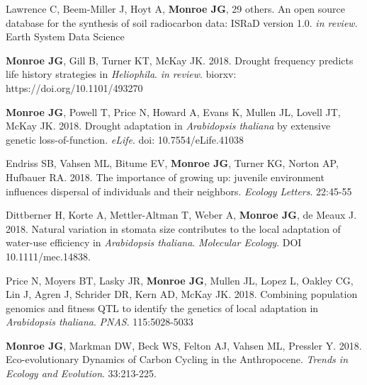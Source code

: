 \documentclass[12pt,english]{article}
\begin{document}
\begin{hangparas}{.5in}{1}
\hspace{1em} Lawrence C, Beem-Miller J, Hoyt A, \textbf{Monroe JG},  29 others. An open source database for the synthesis of soil radiocarbon data: ISRaD version 1.0. \textit{in review}. Earth System Data Science
\vspace{1ex}\par
\hspace{1em} \textbf{Monroe JG}, Gill B, Turner KT, McKay JK. 2018. Drought frequency predicts life history strategies in \textit{Heliophila}. \textit{in review}. biorxv: https://doi.org/10.1101/493270
\vspace{1ex}\par
\hspace{1em} \textbf{Monroe JG}, Powell T, Price N, Howard A, Evans K, Mullen JL, Lovell JT, McKay JK. 2018. Drought adaptation in \textit{Arabidopsis thaliana} by extensive genetic loss-of-function. \textit{eLife}. doi: 10.7554/eLife.41038
\vspace{1ex}\par
\hspace{1em} Endriss SB, Vahsen ML, Bitume EV, \textbf{Monroe JG}, Turner KG, Norton AP, Hufbauer RA. 2018. The importance of growing up: juvenile environment influences dispersal of individuals and their neighbors. \textit{Ecology Letters}. 22:45-55
\vspace{1ex}\par
\hspace{1em} Dittberner H, Korte A, Mettler-Altman T, Weber A, \textbf{Monroe JG}, de Meaux J. 2018. Natural variation in stomata size contributes to the local adaptation of water-use efficiency in \textit{Arabidopsis thaliana}. \textit{Molecular Ecology}. DOI 10.1111/mec.14838.
\vspace{1ex}\par
\hspace{1em}  Price N, Moyers BT, Lasky JR, \textbf{Monroe JG}, Mullen JL, Lopez L, Oakley CG, Lin J, Agren J, Schrider DR, Kern AD, McKay JK. 2018. Combining population genomics and fitness QTL to identify the genetics of local adaptation in \textit{Arabidopsis thaliana}. \textit{PNAS}. 115:5028-5033
\vspace{1ex}\par
\hspace{1em}  \textbf{Monroe JG}, Markman DW, Beck WS, Felton AJ, Vahsen ML, Pressler Y. 2018. Eco-evolutionary Dynamics of Carbon Cycling in the Anthropocene. \textit{Trends in Ecology and Evolution}. 33:213-225.

\end{hangparas}
\end{document}
